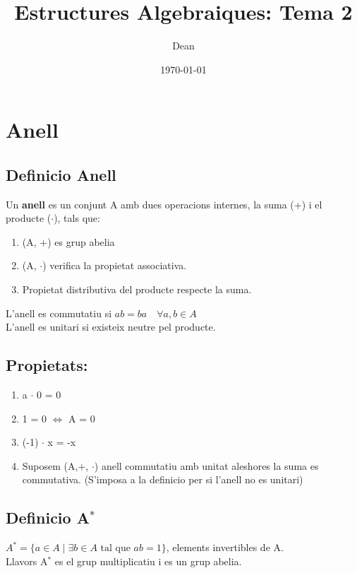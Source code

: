 \documentclass[11pt]{article}
\author{Dean}
\date{\today}
\title{Estructures Algebraiques: Tema 2}
\begin{document}
\maketitle
\setcounter{tocdepth}{4}
\tableofcontents


\section{Anell}
\label{sec:orgd27d9dd}

\subsection{Definicio Anell}
\label{sec:orgc222efc}
Un \textbf{anell} es un conjunt A amb dues operacions internes, la suma (+) i el producte (\(\cdot\)), tals que: \\
\begin{enumerate}
\item (A, +) es grup abelia
\item (A, \(\cdot\)) verifica la propietat associativa.
\item Propietat distributiva del producte respecte la suma.
\end{enumerate}
L'anell es commutatiu si \(ab = ba \quad \forall a,b \in A\) \\
L'anell es unitari si existeix neutre pel producte.

\subsection{Propietats:}
\label{sec:orgb4af416}
\begin{enumerate}
\item a \(\cdot\) 0 = 0
\item 1 = 0 \(\iff\) A = 0
\item (-1) \(\cdot\) x = -x
\item Suposem (A,+, \(\cdot\)) anell commutatiu amb unitat aleshores la suma es commutativa. (S'imposa a la definicio per si l'anell no es unitari)
\end{enumerate}


\subsection{Definicio A\(^{\text{*}}\)}
\label{sec:orga1a6fab}
\(A^{*} = \{ a \in A \mid \exists b \in A \text{ tal que } ab = 1 \}\), elements invertibles de A. \\
Llavors A\(^{\text{*}}\) es el grup multiplicatiu i es un grup abelia.
\end{document}
